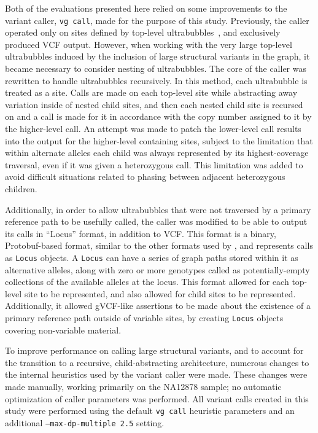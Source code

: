 Both of the evaluations presented here relied on some improvements to the \vg variant caller, \texttt{vg call}, made for the purpose of this study. Previously, the caller operated only on sites defined by top-level ultrabubbles~\cite{paten2017superbubbles}, and exclusively produced VCF output. However, when working with the very large top-level ultrabubbles induced by the inclusion of large structural variants in the graph, it became necessary to consider nesting of ultrabubbles. The core of the caller was rewritten to handle ultrabubbles recursively. In this method, each ultrabubble is treated as a site. Calls are made on each top-level site while abstracting away variation inside of nested child sites, and then each nested child site is recursed on and a call is made for it in accordance with the copy number assigned to it by the higher-level call. An attempt was made to patch the lower-level call results into the output for the higher-level containing sites, subject to the limitation that within alternate alleles each child was always represented by its highest-coverage traversal, even if it was given a heterozygous call. This limitation was added to avoid difficult situations related to phasing between adjacent heterozygous children.

Additionally, in order to allow ultrabubbles that were not traversed by a primary reference path to be usefully called, the caller was modified to be able to output its calls in ``Locus'' format, in addition to VCF. This format is a binary, Protobuf-based format, similar to the other formats used by \vg, and represents calls as \texttt{Locus} objects. A \texttt{Locus} can have a series of graph paths stored within it as alternative alleles, along with zero or more genotypes called as potentially-empty collections of the available alleles at the locus. This format allowed for each top-level site to be represented, and also allowed for child sites to be represented. Additionally, it allowed gVCF-like assertions to be made about the existence of a primary reference path outside of variable sites, by creating \texttt{Locus} objects covering non-variable material.

To improve performance on calling large structural variants, and to account for the transition to a recursive, child-abstracting architecture, numerous changes to the internal heuristics used by the variant caller were made. These changes were made manually, working primarily on the NA12878 sample; no automatic optimization of caller parameters was performed. All variant calls created in this study were performed using the default \texttt{vg call} heuristic parameters and an additional \texttt{--max-dp-multiple 2.5} setting.


